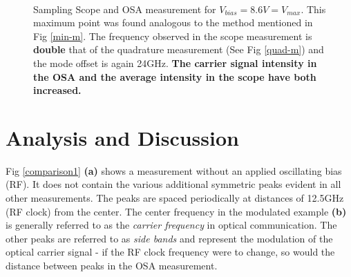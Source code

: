 \documentclass[12pt,a4paper]{report}
\begin{document}
\begin{figure}
    \centering
    \quad
    \\
    \vspace{0.45cm}
    \caption{Sampling Scope and OSA measurement for $V_{bias}=8.6V=V_{max}$. This maximum point was found analogous to the method mentioned in Fig \ref{min-m}. The frequency observed in the scope measurement is \textbf{double} that of the quadrature measurement (See Fig \ref{quad-m}) and the mode offset is again 24GHz. \textbf{The carrier signal intensity in the OSA and the average intensity in the scope have both increased.}}
    \label{max-m}
    \vspace{-12pt}
\end{figure}

\section{Analysis and Discussion}\label{sec:analysis}
Fig \ref{comparison1} \textbf{(a)} shows a measurement without an applied oscillating bias (RF). It does not contain the various additional symmetric peaks evident in all other measurements. The peaks are spaced periodically at distances of 12.5GHz (RF clock) from the center. The center frequency in the modulated example \textbf{(b)} is generally referred to as the \emph{carrier frequency} in optical communication. The other peaks are referred to as \emph{side bands} and represent the modulation of the optical carrier signal - if the RF clock frequency were to change, so would the distance between peaks in the OSA measurement.
\end{document}
